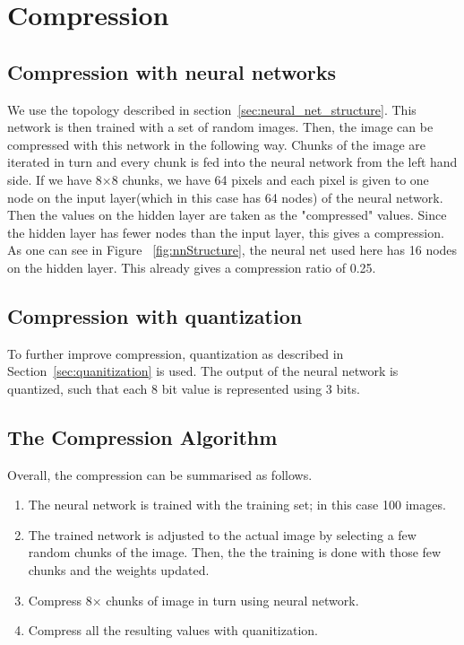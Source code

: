 \documentclass[10pt,conference,compsocconf]{IEEEtran}
\begin{document}
\section{Compression}

\subsection{Compression with neural networks}
We use the topology described in section~\ref{sec:neural_net_structure}. This network is then trained with a set of random images. Then, the image can be compressed with this network in the following way. Chunks of the image are iterated in turn and every chunk is fed into the neural network from the left hand side. If we have 8$\times$8 chunks, we have 64 pixels and each pixel is given to one node on the input layer(which in this case has 64 nodes) of the neural network. Then the values on the hidden layer are taken as the "compressed" values. Since the hidden layer has fewer nodes than the input layer, this gives a compression. As one can see in Figure ~\ref{fig:nnStructure}, the neural net used here has 16 nodes on the hidden layer. This already gives a compression ratio of 0.25. 

\subsection{Compression with quantization}
To further improve compression, quantization as described in Section~\ref{sec:quanitization} is used. The output of the neural network is quantized, such that each 8 bit value is represented using 3 bits.  

\subsection{The Compression Algorithm}
\label{sec:compAlg}

Overall, the compression can be summarised as follows.

\begin{enumerate}
\item The neural network is trained with the training set; in this case 100 images.
\item The trained network is adjusted to the actual image by selecting a few random chunks of the image. Then, the the training is done with those few chunks and the weights updated. 
\item Compress 8$\times$ chunks of image in turn using neural network.
\item Compress all the resulting values with quanitization.

\end{enumerate}
\end{document}
